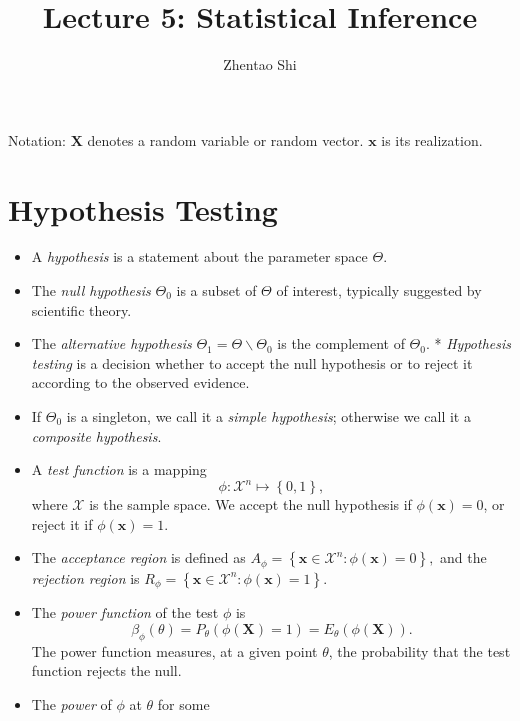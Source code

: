 \documentclass[11pt]{article}
\title{Lecture 5: Statistical Inference}
\author{Zhentao Shi}
\begin{document}
    
    
    \maketitle
    
    

    
    Notation: \(\mathbf{X}\) denotes a random variable or random vector.
\(\mathbf{x}\) is its realization.

\section{Hypothesis Testing}\label{hypothesis-testing}

\begin{itemize}
\item
  A \emph{hypothesis} is a statement about the parameter space
  \(\Theta\).
\item
  The \emph{null hypothesis} \(\Theta_{0}\) is a subset of \(\Theta\) of
  interest, typically suggested by scientific theory.
\item
  The \emph{alternative hypothesis}
  \(\Theta_{1}=\Theta\backslash\Theta_{0}\) is the complement of
  \(\Theta_{0}\). * \emph{Hypothesis testing} is a decision whether to
  accept the null hypothesis or to reject it according to the observed
  evidence.
\item
  If \(\Theta_0\) is a singleton, we call it a \emph{simple hypothesis};
  otherwise we call it a \emph{composite hypothesis}.
\item
  A \emph{test function} is a mapping
  \[\phi:\mathcal{X}^{n}\mapsto\left\{ 0,1\right\},\] where
  \(\mathcal{X}\) is the sample space. We accept the null hypothesis if
  \(\phi\left(\mathbf{x}\right)=0\), or reject it if
  \(\phi\left(\mathbf{x}\right)=1\).
\item
  The \emph{acceptance region} is defined as
  \(A_{\phi}=\left\{ \mathbf{x}\in\mathcal{X}^{n}:\phi\left(\mathbf{x}\right)=0\right\} ,\)
  and the \emph{rejection region} is
  \(R_{\phi}=\left\{ \mathbf{x}\in\mathcal{X}^{n}:\phi\left(\mathbf{x}\right)=1\right\} .\)
\item
  The \emph{power function} of the test \(\phi\) is
  \[\beta_{\phi}\left(\theta\right)=P_{\theta}\left(\phi\left(\mathbf{X}\right)=1\right)=E_{\theta}\left(\phi\left(\mathbf{X}\right)\right).\]
  The power function measures, at a given point \(\theta\), the
  probability that the test function rejects the null.
\item
  The \emph{power} of \(\phi\) at \(\theta\) for some

\end{itemize}
\end{document}

